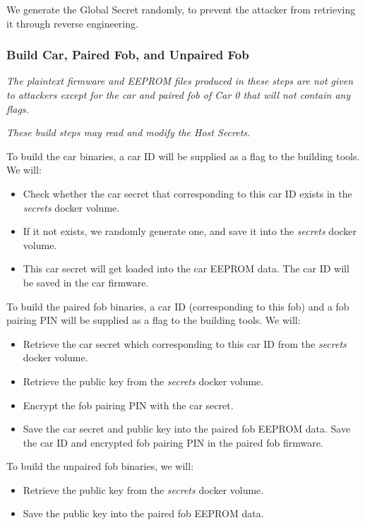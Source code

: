 \documentclass[11pt,oneside,onecolumn,letterpaper]{article}
\begin{document}
We generate the Global Secret randomly, to prevent the attacker from retrieving it through reverse engineering.

\subsubsection{Build Car, Paired Fob, and Unpaired Fob}

\textit{The plaintext firmware and EEPROM files produced in these steps are not given to attackers except for the car and paired fob of Car 0 that will not contain any flags.}

\textit{These build steps may read and modify the Host Secrets.}

To build the car binaries, a car ID will be supplied as a flag to the building tools. We will:
\begin{itemize}
	\item Check whether the car secret that corresponding to this car ID exists in the \textit{secrets} docker volume.
	\item If it not exists, we randomly generate one, and save it into the \textit{secrets} docker volume.
	\item This car secret will get loaded into the car EEPROM data. The car ID will be saved in the car firmware.
\end{itemize}

To build the paired fob binaries, a car ID (corresponding to this fob) and a fob pairing PIN will be supplied as a flag to the building tools. We will:
\begin{itemize}
	\item Retrieve the car secret which corresponding to this car ID from the \textit{secrets} docker volume.
	\item Retrieve the public key from the \textit{secrets} docker volume.
	\item Encrypt the fob pairing PIN with the car secret.
	\item Save the car secret and public key into the paired fob EEPROM data. Save the car ID and encrypted fob pairing PIN in the paired fob firmware.
\end{itemize}

To build the unpaired fob binaries, we will:
\begin{itemize}
	\item Retrieve the public key from the \textit{secrets} docker volume.
	\item Save the public key into the paired fob EEPROM data.
\end{itemize}
\end{document}
